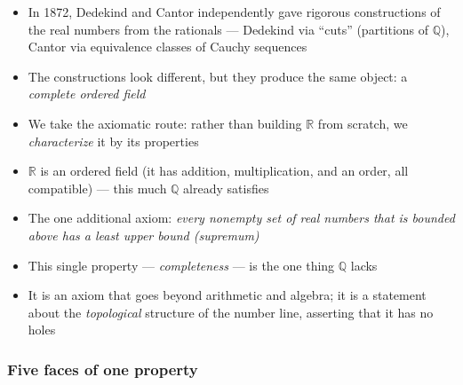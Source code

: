 \documentclass[
  10pt,
  letterpaper,
]{scrbook}
\providecommand{\tightlist}{%
  \setlength{\itemsep}{0pt}\setlength{\parskip}{0pt}}
\newcommand{\QQ}{\mathbb{Q}}
\newcommand{\RR}{\mathbb{R}}
\begin{document}
\begin{itemize}
\tightlist
\item
  In 1872, Dedekind and Cantor independently gave rigorous constructions
  of the real numbers from the rationals --- Dedekind via ``cuts''
  (partitions of \(\QQ\)), Cantor via equivalence classes of Cauchy
  sequences
\item
  The constructions look different, but they produce the same object: a
  \emph{complete ordered field}
\item
  We take the axiomatic route: rather than building \(\RR\) from
  scratch, we \emph{characterize} it by its properties
\item
  \(\RR\) is an ordered field (it has addition, multiplication, and an
  order, all compatible) --- this much \(\QQ\) already satisfies
\item
  The one additional axiom: \emph{every nonempty set of real numbers
  that is bounded above has a least upper bound (supremum)}
\item
  This single property --- \emph{completeness} --- is the one thing
  \(\QQ\) lacks
\item
  It is an axiom that goes beyond arithmetic and algebra; it is a
  statement about the \emph{topological} structure of the number line,
  asserting that it has no holes
\end{itemize}

\subsubsection*{Five faces of one
property}\label{five-faces-of-one-property}
\end{document}
